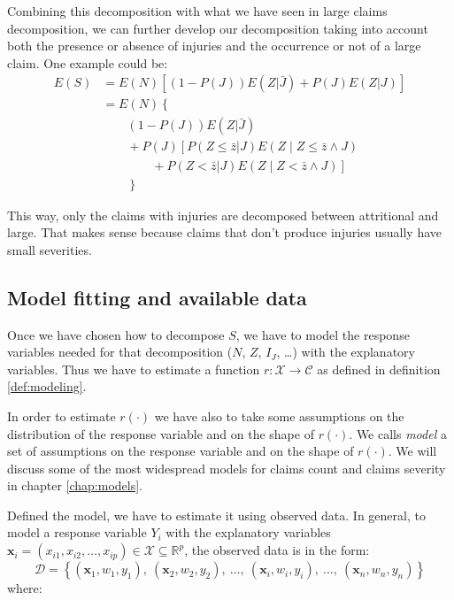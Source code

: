 \documentclass[a4paper, twoside, openright, 12pt]{report}
\theoremstyle{definition}
\theoremstyle{definition}
\theoremstyle{definition}
\theoremstyle{remark}
\begin{document}
Combining this decomposition with what we have seen in large claims decomposition, we can further develop our decomposition taking into account both the presence or absence of injuries and the occurrence or not of a large claim. One example could be:
\begin{align*}
E(S) & = E(N) \left[\left( 1 - P(J) \right) E(Z|\bar{J}) + P(J) E(Z|J) \right] \\[4pt]
  & = E(N) \left\{ \right. \\
  & \qquad \left( 1 - P(J) \right) E(Z|\bar{J}) \\
  & \qquad + P(J) \left[ P(Z \le \bar{z} | J) E\left( Z \mid Z\le \bar{z} \land J \right) \right. \\
  & \qquad \qquad + \left. P(Z < \bar{z} | J) E\left( Z \mid Z < \bar{z} \land J \right) \right] \\
  & \qquad \left. \right\}
\end{align*}

This way, only the claims with injuries are decomposed between attritional and large. That makes sense because claims that don't produce injuries usually have small severities.

\hypertarget{chap:model-fitting-and-data-available}{%
\subsection{Model fitting and available data}\label{chap:model-fitting-and-data-available}}

Once we have chosen how to decompose \(S\), we have to model the response variables needed for that decomposition (\(N\), \(Z\), \(I_J\), \ldots) with the explanatory variables. Thus we have to estimate a function \(r:\mathcal{X}\rightarrow \mathcal{C}\) as defined in definition \ref{def:modeling}.

In order to estimate \(r(\cdot)\) we have also to take some assumptions on the distribution of the response variable and on the shape of \(r(\cdot)\). We calls \emph{model} a set of assumptions on the response variable and on the shape of \(r(\cdot)\). We will discuss some of the most widespread models for claims count and claims severity in chapter \ref{chap:models}.

Defined the model, we have to estimate it using observed data. In general, to model a response variable \(Y_i\) with the explanatory variables \(\boldsymbol{x}_i=(x_{i1}, x_{i2}, \dots, x_{ip})\in \mathcal{X} \subseteq \mathbb{R}^p\), the observed data is in the form:
\[
\mathcal{D} = \left\{(\boldsymbol{x}_1, w_1, y_1), \ (\boldsymbol{x}_2, w_2, y_2), \ \dots, \ (\boldsymbol{x}_i, w_i, y_i), \ \dots, \ (\boldsymbol{x}_n, w_n, y_n)\right\}
\]
where:
\end{document}
